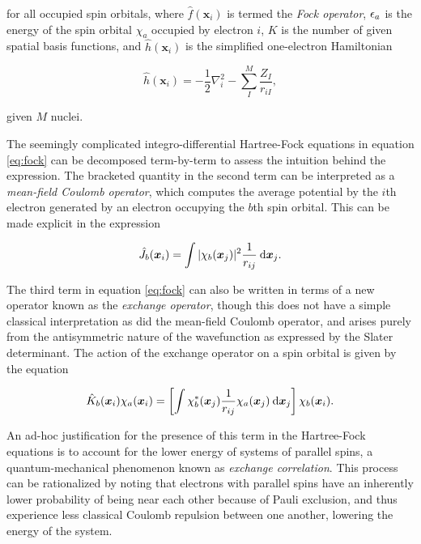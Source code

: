 \noindent for all occupied spin orbitals, where $\hat f(\bm x_i)$ is termed the
\emph{Fock operator}, $\epsilon_a$ is the energy of the spin orbital $\chi_a$
occupied by electron $i$, $K$ is the number of given spatial basis functions,
and $\hat h (\bm x_i)$ is the simplified one-electron Hamiltonian

\begin{equation}
\hat h (\bm x_i) = - \frac{1}{2} \nabla_i^2
	           - \sum_I^M \frac{Z_I}{r_{iI}},
\end{equation}

\noindent given $M$ nuclei.

The seemingly complicated integro-differential Hartree-Fock equations in
equation \ref{eq:fock} can be decomposed term-by-term to assess the intuition
behind the expression. The bracketed quantity in the second term can be
interpreted as a \emph{mean-field Coulomb operator}, which computes the average
potential by the $i$th electron generated by an electron occupying the $b$th
spin orbital. This can be made explicit in the expression

\begin{equation}
\hat J_b (\bm x_i) = \int |\chi_b (\bm x_j)|^2 \frac{1}{r_{ij}} \:\mathrm{d} \bm x_j.
\end{equation}

The third term in equation \ref{eq:fock} can also be written in terms of a new
operator known as the \emph{exchange operator}, though this does not have a
simple classical interpretation as did the mean-field Coulomb operator, and
arises purely from the antisymmetric nature of the wavefunction as expressed by
the Slater determinant. The action of the exchange operator on a spin orbital is
given by the equation

\begin{equation}
	\hat K_b (\bm x_i) \chi_a(\bm x_i) =
	\left[ \int \chi_b^* (\bm x_j) \frac{1}{r_{ij}} \chi_a(\bm x_j) \:\mathrm{d} \bm x_j \right]
	\chi_b (\bm x_i).
\end{equation}

An ad-hoc justification for the presence of this term in the Hartree-Fock
equations is to account for the lower energy of systems of parallel spins, a
quantum-mechanical phenomenon known as \emph{exchange correlation}. This process
can be rationalized by noting that electrons with parallel spins have an
inherently lower probability of being near each other because of Pauli
exclusion, and thus experience less classical Coulomb repulsion between one
another, lowering the energy of the system.

